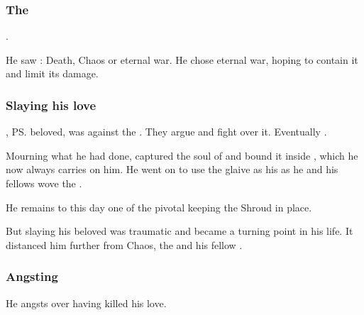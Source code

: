 \subsubsection{The \SecondShrouding}
\Ishnaruchaefir{} . 

He saw : 
Death, Chaos or eternal war. 
He chose eternal war, hoping to contain it and limit its damage. 







\subsubsection{Slaying his love}
\Triestessakhin, \ps{\Ishnaruchaefir} beloved, was against the \SecondShrouding{}. 
They argue and fight over it. 
Eventually . 

Mourning what he had done, \Ishnaruchaefir{} captured the soul of \Triestessakhin{} and bound it inside , which he now always carries on him. 
He went on to use the glaive as his  as he and his fellows wove the . 

He remains to this day one of the pivotal \vertices{} keeping the Shroud in place.

But slaying his beloved was traumatic and became a turning point in his life. It distanced him further from Chaos, the \firstgendragons{} and his fellow \dragons.





\subsubsection{Angsting}
He angsts over having killed his love. 

